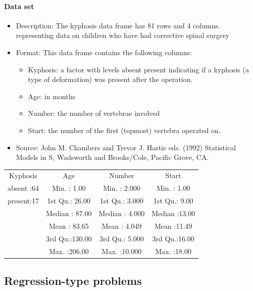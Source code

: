 \documentclass[final, paper=letter,5p,times,twocolumn]{elsarticle}
\begin{document}
\paragraph{Data set}{
  \begin{itemize}
  \item Description: The kyphosis data frame has 81 rows and 4 columns. representing data on children who have had corrective spinal surgery
  \item Format: This data frame contains the following columns:
    \begin{itemize}
    \item Kyphosis: a factor with levels absent present indicating if a kyphosis (a type of deformation) was present after the operation.
    \item Age: in months
    \item Number: the number of vertebrae involved
    \item Start: the number of the first (topmost) vertebra operated on.
    \end{itemize}
  \item Source: John M. Chambers and Trevor J. Hastie eds. (1992) Statistical Models in S, Wadsworth and Brooks/Cole, Pacific Grove, CA.
  \end{itemize}
}
\begin{table}[]
\begin{tabular}{cccc}
  Kyphosis   &    Age           &       Number    &       Start    \\
  absent :64 &  Min.   :  1.00  &  Min.   : 2.000 &  Min.   : 1.00  \\
  present:17 &  1st Qu.: 26.00  &  1st Qu.: 3.000 &  1st Qu.: 9.00  \\
             & Median : 87.00   &  Median : 4.000 &  Median :13.00  \\
             & Mean   : 83.65   &  Mean   : 4.049 &  Mean   :11.49  \\
             & 3rd Qu.:130.00   &  3rd Qu.: 5.000 &  3rd Qu.:16.00  \\
             & Max.   :206.00   &  Max.   :10.000 &  Max.   :18.00
\end{tabular}
\end{table}


\subsection{Regression-type problems}
\end{document}
